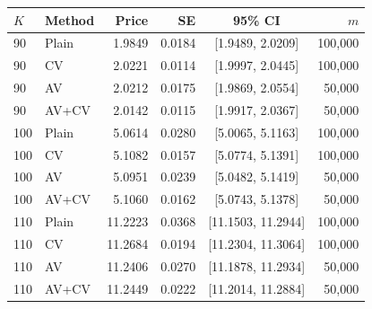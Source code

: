\begin{tabular}{llrrcr}
\toprule
$K$ & Method & Price & SE & 95\% CI & $m$ \\
\midrule
90 & Plain & 1.9849 & 0.0184 & [1.9489, 2.0209] & 100,000 \\
90 & CV & 2.0221 & 0.0114 & [1.9997, 2.0445] & 100,000 \\
90 & AV & 2.0212 & 0.0175 & [1.9869, 2.0554] & 50,000 \\
90 & AV+CV & 2.0142 & 0.0115 & [1.9917, 2.0367] & 50,000 \\
\midrule
100 & Plain & 5.0614 & 0.0280 & [5.0065, 5.1163] & 100,000 \\
100 & CV & 5.1082 & 0.0157 & [5.0774, 5.1391] & 100,000 \\
100 & AV & 5.0951 & 0.0239 & [5.0482, 5.1419] & 50,000 \\
100 & AV+CV & 5.1060 & 0.0162 & [5.0743, 5.1378] & 50,000 \\
\midrule
110 & Plain & 11.2223 & 0.0368 & [11.1503, 11.2944] & 100,000 \\
110 & CV & 11.2684 & 0.0194 & [11.2304, 11.3064] & 100,000 \\
110 & AV & 11.2406 & 0.0270 & [11.1878, 11.2934] & 50,000 \\
110 & AV+CV & 11.2449 & 0.0222 & [11.2014, 11.2884] & 50,000 \\
\bottomrule
\end{tabular}
